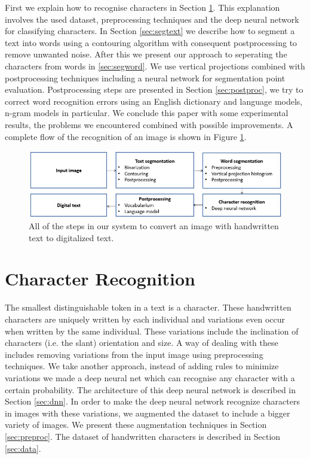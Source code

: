 \documentclass{article}
\begin{document}
First we explain how to recognise characters in Section \ref{sec:charrec}. This explanation involves the used dataset, preprocessing techniques and the deep neural network for classifying characters.
In Section \ref{sec:segtext} we describe how to segment a text into words using a contouring algorithm with consequent postprocessing to remove unwanted noise.
After this we present our approach to seperating the characters from words in \ref{sec:segword}. We use vertical projections combined with postprocessing techniques including a neural network for segmentation point evaluation.
Postprocessing steps are presented in Section \ref{sec:postproc}, we try to correct word recognition errors using an English dictionary and language models, n-gram models in particular.
We conclude this paper with some experimental results, the problems we encountered combined with possible improvements. A complete flow of the recognition of an image is shown in Figure \ref{fig:flow}.

\begin{figure}
  \centering
  \includegraphics[width=\linewidth]{images/flow_hor}
  \caption{All of the steps in our system to convert an image with handwritten text to digitalized text.}
  \label{fig:flow}
\end{figure}

\section{Character Recognition}
\label{sec:charrec}
The smallest distinguishable token in a text is a character. These handwritten characters are uniquely
written by each individual and variations even occur when written by the same individual. These variations include the inclination of characters (i.e. the slant) orientation and size.
A way of dealing with these includes removing variations from the input image using preprocessing techniques.
We take another approach, instead of adding rules to minimize variations we made a deep neural net which can recognise any character with a certain probability. The architecture of this deep neural network is described in Section \ref{sec:dnn}.
In order to make the deep neural network recognize characters in images with these variations, we augmented the dataset to include a bigger variety of images. We present these augmentation techniques in Section \ref{sec:preproc}.
The dataset of handwritten characters is described in Section \ref{sec:data}.
\end{document}
